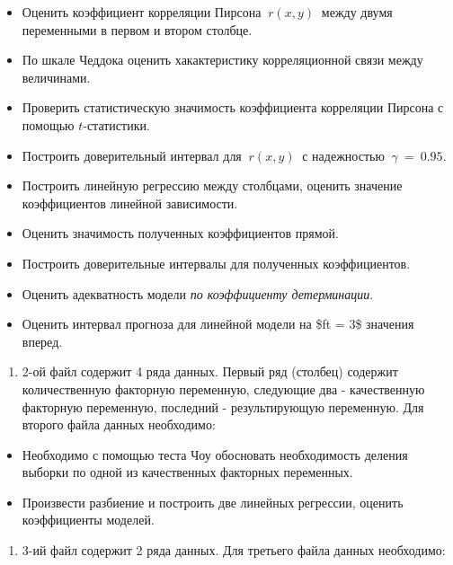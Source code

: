 \documentclass[
]{article}
\providecommand{\tightlist}{%
  \setlength{\itemsep}{0pt}\setlength{\parskip}{0pt}}
\begin{document}
\begin{itemize}
\item
  Оценить коэффициент корреляции Пирсона \(\ r(x, y)\ \) между двумя
  переменными в первом и втором столбце.
\item
  По шкале Чеддока оценить хакактеристику корреляционной связи между
  величинами.
\item
  Проверить статистическую значимость коэффициента корреляции Пирсона с
  помощью \(t\)-статистики.
\item
  Построить доверительный интервал для \(\ r(x, y)\ \) с надежностью
  \(\ \gamma\ = \ 0.95\).
\item
  Построить линейную регрессию между столбцами, оценить значение
  коэффициентов линейной зависимости.
\item
  Оценить значимость полученных коэффициентов прямой.
\item
  Построить доверительные интервалы для полученных коэффициентов.
\item
  Оценить адекватность модели \emph{по коэффициенту детерминации}.
\item
  Оценить интервал прогноза для линейной модели на \$ft = 3\$ значения
  вперед.
\end{itemize}

\begin{enumerate}
\def\labelenumi{\arabic{enumi}.}
\setcounter{enumi}{1}
\tightlist
\item
  2-ой файл содержит 4 ряда данных. Первый ряд (столбец) содержит
  количественную факторную переменную, следующие два - качественную
  факторную переменную, последний - результирующую переменную. Для
  второго файла данных необходимо:
\end{enumerate}

\begin{itemize}
\item
  Необходимо с помощью теста Чоу обосновать необходимость деления
  выборки по одной из качественных факторных переменных.
\item
  Произвести разбиение и построить две линейных регрессии, оценить
  коэффициенты моделей.
\end{itemize}

\begin{enumerate}
\def\labelenumi{\arabic{enumi}.}
\setcounter{enumi}{2}
\tightlist
\item
  3-ий файл содержит 2 ряда данных. Для третьего файла данных
  необходимо:
\end{enumerate}
\end{document}
